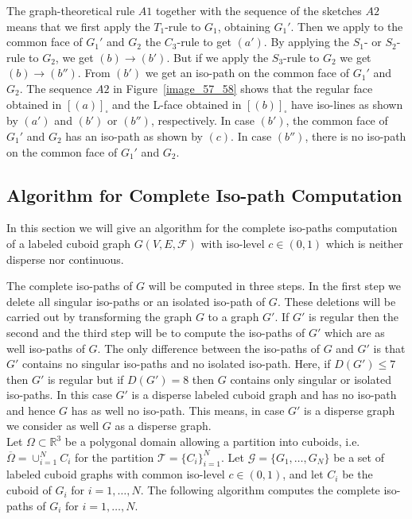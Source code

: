 \documentclass[a4paper,11pt]{article}
\begin{document}
\FloatBarrier
{}The graph-theoretical rule $A1$ together with
the sequence of the sketches $A2$ means that we first apply the $T_1$-rule to $G_1$, obtaining $G_1'$.
Then we apply to the common face of $G_1'$ and $G_2$ the $C_3$-rule to get $(a')$. By applying the $S_1$- or
$S_2$-rule to $G_2$, we get $(b)\longrightarrow (b')$. But if we apply the $S_3$-rule to $G_2$ we get
$(b)\longrightarrow (b'')$. From $(b')$ we get an iso-path on the common face of $G_1'$ and $G_2$. The
sequence $A2$ in Figure~\ref{image_57_58} shows that the regular face obtained in $[(a)]_{\square}$ and the
L-face obtained in $[(b)]_{\square}$ have iso-lines as shown by $(a')$ and $(b')$ or $(b'')$, respectively.
In case $(b')$, the common face of $G_1'$ and $G_2$ has an iso-path as shown by $(c)$. In case $(b'')$, there
is no iso-path on the common face of $G_1'$ and $G_2$.
\FloatBarrier

\subsection{Algorithm for Complete Iso-path Computation}
In this section we will give an algorithm for the complete iso-paths computation of a labeled cuboid graph
$G(V,E,\mathcal{F})$ with iso-level $c\in (0,1)$ which is neither disperse nor continuous.

The complete iso-paths of $G$ will be computed in three steps. In the first step we delete all singular
iso-paths or an isolated iso-path of $G$. These deletions will be carried out by transforming the graph
$G$ to a graph $G'$. If $G'$ is regular then the second and the third step will be
to compute the iso-paths of $G'$ which are as well iso-paths of $G$. The only difference between the
iso-paths of $G$ and $G'$ is that $G'$ contains no singular iso-paths and no isolated iso-path. Here,
if $D(G')\leq 7$ then $G'$ is regular but if $D(G')=8$ then $G$ contains only singular or isolated iso-paths.
In this case $G'$ is a disperse labeled cuboid graph and has no iso-path and hence $G$ has as well no iso-path.
This means, in case $G'$ is a disperse graph we consider as well $G$ as a disperse graph.\\

Let $\Omega\subset\mathbb{R}^3$ be a polygonal domain allowing a partition into cuboids,
i.e. $\overline{\Omega}=\cup_{i=1}^NC_i$ for the partition $\mathcal{T}=\{C_i\}_{i=1}^N$.  Let
$\mathcal{G}=\{G_1,\ldots,G_N\}$ be a set of labeled cuboid graphs
with common iso-level $c\in (0,1)$, and let $C_i$ be the cuboid of $G_i$ for $i=1,\ldots,N$. The following
algorithm computes the complete iso-paths of $G_i$ for $i=1,\ldots,N$.
\end{document}
